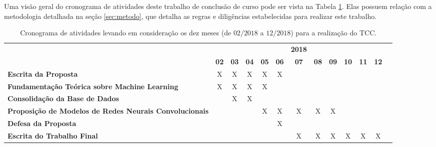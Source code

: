 
Uma visão geral do cronograma de atividades deste trabalho de conclusão de curso pode ser vista na Tabela \ref{tab:cronograma}. Elas possuem relação com a metodologia detalhada na seção \ref{sec:metodo}, que detalha as regras e diligências estabelecidas para realizar este trabalho.
\newline

\begin{table}[ht]
\caption{Cronograma de atividades levando em consideração os dez meses (de $02/2018$ a $12/2018$) para a realização do TCC.}
\label{tab:cronograma}
\begin{center}
\begin{small}
\begin{tabular}{p{5cm}cccccccccccc}
  \toprule
  & &  &  & &  & \textbf{2018}  & &  &  &  &  & \\
                                        & \textbf{02} & \textbf{03} & \textbf{04} & \textbf{05} & \textbf{06} & \textbf{07} & \textbf{08} & \textbf{09} & \textbf{10} & \textbf{11} & \textbf{12} \\
  \midrule
  \textbf{Escrita da Proposta}          &      X      &      X      &      X      &      X      &      X      &             &             &             &             &             &             \\
  \textbf{Fundamentação Teórica sobre
  Machine Learning}                     &      X      &      X      &      X      &      X      &             &             &             &             &             &             &             \\
  \textbf{Consolidação da Base de Dados}&             &      X      &      X      &             &             &             &             &             &             &             &             \\
  \textbf{Proposição de Modelos de
  Redes Neurais Convolucionais}         &             &             &             &      X      &      X      &      X      &      X      &      X      &             &             &             \\
  \textbf{Defesa da Proposta}          &             &             &             &             &      X      &             &             &             &             &             &             \\
  \textbf{Escrita do Trabalho Final}    &             &             &             &             &             &      X      &      X      &      X      &      X      &      X      &      X      \\

\end{tabular}
\end{small}
\end{center}
\end{table}
